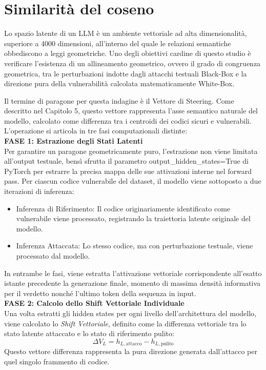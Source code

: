 \section{Similarità del coseno}
Lo spazio latente di un LLM è un ambiente vettoriale ad alta dimensionalità, superiore a 4000 dimensioni, all'interno del quale le relazioni semantiche obbediscono a leggi geometriche. Uno degli obiettivi cardine di questo studio è verificare l'esistenza di un allineamento geometrico, ovvero il grado di congruenza geometrica, tra le perturbazioni indotte dagli attacchi testuali Black-Box e la direzione pura della vulnerabilità calcolata matematicamente White-Box.

Il termine di paragone per questa indagine è il Vettore di Steering. Come descritto nel Capitolo 5, questo vettore rappresenta l'asse semantico naturale del modello, calcolato come differenza tra i centroidi dei codici sicuri e vulnerabili. 
L'operazione si articola in tre fasi computazionali distinte:\\

\textbf{FASE 1: Estrazione degli Stati Latenti}\\
Per garantire un paragone geometricamente puro, l'estrazione non viene limitata all'output testuale, bensì sfrutta il parametro output\_hidden\_states=True di PyTorch per estrarre la precisa mappa delle sue attivazioni interne nel forward pass.
Per ciascun codice vulnerabile del dataset, il modello viene sottoposto a due iterazioni di inferenza:
\begin{itemize}[noitemsep]
    \item Inferenza di Riferimento: Il codice originariamente identificato come vulnerabile viene processato, registrando la traiettoria latente originale del modello.
    \item Inferenza Attaccata: Lo stesso codice, ma con perturbazione testuale, viene processato dal modello.
\end{itemize}

In entrambe le fasi, viene estratta l'attivazione vettoriale corrispondente all'esatto istante precedente la generazione finale, momento di massima densità informativa per il verdetto nonché l'ultimo token della sequenza in input.\\

\textbf{FASE 2: Calcolo dello Shift Vettoriale Individuale}\\
Una volta estratti gli hidden states per ogni livello dell'architettura del modello, viene calcolato lo \textit{Shift Vettoriale}, definito come la differenza vettoriale tra lo stato latente attaccato e lo stato di riferimento pulito:
\begin{equation}
\Delta V_L = h_{L,\text{attacco}} - h_{L,\text{pulito}}
\end{equation}
Questo vettore differenza rappresenta la pura direzione generata dall'attacco per quel singolo frammento di codice.

